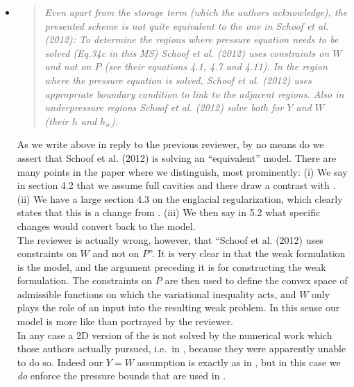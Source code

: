 \documentclass[11pt,reqno]{amsart}
\newcommand{\reply}[2]{
\medskip\medskip
\item  \begin{quote}
\emph{#1}
\end{quote}

\medskip
\noindent #2}
\begin{document}
\begin{itemize}
\reply{Even apart from the storage term (which the authors acknowledge), the presented scheme is not quite equivalent to the one in Schoof et al. (2012): To determine the regions where pressure equation needs to be solved (Eq.34c in this MS) Schoof et al. (2012) uses constraints on $W$ and not on $P$ (see their equations 4.1, 4.7 and 4.11).  In the region where the pressure equation is solved, Schoof et al. (2012) uses appropriate boundary condition to link to the adjacent regions.  Also in underpressure regions
Schoof et al. (2012) solve both for $Y$ and $W$ (their $h$ and $h_w$).}
{As we write above in reply to the previous reviewer, by no means do we assert that Schoof et al. (2012) \cite{Schoofetal2012} is solving an ``equivalent'' model.  There are many points in the paper where we distinguish, most prominently: (i) We say in section 4.2 that we assume full cavities and there draw a contrast with \cite{Schoofetal2012}. (ii) We have a large section 4.3 on the englacial regularization, which clearly states that this is a change from \cite{Schoofetal2012}. (iii) We then say in 5.2 what specific changes would convert back to the \cite{Schoofetal2012} model. \\
\indent The reviewer is actually wrong, however, that ``Schoof et al. (2012) uses constraints on $W$ and not on $P$''.  It is very clear in \cite{Schoofetal2012} that the weak formulation is the model, and the argument preceding it is for constructing the weak formulation.  The constraints on $P$ are then used to define the convex space of admissible functions on which the variational inequality acts, and $W$ only plays the role of an input into the resulting weak problem.  In this sense our model is more like \cite{Schoofetal2012} than portrayed by the reviewer. \\
\indent In any case a 2D version of the \cite{Schoofetal2012} is not solved by the numerical work which those authors actually pursued, i.e.~in \cite{Werderetal2013}, because they were apparently unable to do so.  Indeed our $Y=W$ assumption is exactly as in \cite{Werderetal2013}, but in this case we \emph{do} enforce the pressure bounds that are used in \cite{Schoofetal2012}.}


\end{itemize}
\end{document}

